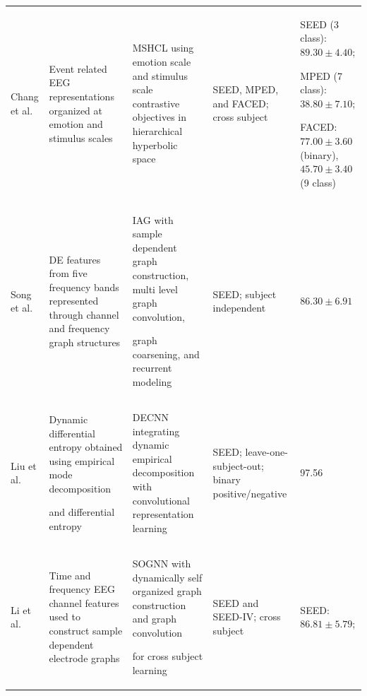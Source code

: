 \documentclass[ASNA,twocolumn]{USG}
\newcommand{\lightrowsep}{%
  \arrayrulecolor{lightrowgray}%
  \specialrule{0.30pt}{3.5pt}{3.5pt}%
  \arrayrulecolor{black}%
}
\begin{document}
\begin{table}
\begin{tabularx}{\textheight}{>{\raggedright\arraybackslash}p{3.15cm}>{\raggedright\arraybackslash}X>{\raggedright\arraybackslash}X>{\raggedright\arraybackslash}p{3.45cm}>{\raggedright\arraybackslash}p{5.0cm}}
\lightrowsep

Chang et al. \cite{chang2025multi} &

Event related EEG representations organized at emotion and stimulus scales &

MSHCL using emotion scale and stimulus scale contrastive objectives in hierarchical hyperbolic space &

SEED, MPED, and FACED; cross subject &

SEED (3 class): $89.30 \pm 4.40$;

MPED (7 class): $38.80 \pm 7.10$;

FACED: $77.00 \pm 3.60$ (binary), $45.70 \pm 3.40$ (9 class) \\

\lightrowsep

Song et al. \cite{song2020instance} &

DE features from five frequency bands represented through channel and frequency graph structures &

IAG with sample dependent graph construction, multi level graph convolution,

graph coarsening, and recurrent modeling &

SEED; subject independent &

$86.30 \pm 6.91$ \\

\lightrowsep

Liu et al. \cite{liu2020subject} &

Dynamic differential entropy obtained using empirical mode decomposition

and differential entropy &

DECNN integrating dynamic empirical decomposition with convolutional representation learning &

SEED; leave-one-subject-out; binary positive/negative &

97.56 \\

\lightrowsep

Li et al. \cite{li2021cross} &

Time and frequency EEG channel features used to construct sample dependent electrode graphs &

SOGNN with dynamically self organized graph construction and graph convolution

for cross subject learning &

SEED and SEED-IV; cross subject &

SEED: $86.81 \pm 5.79$;


\end{tabularx}
\end{table}
\end{document}

